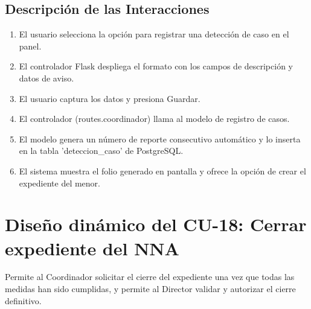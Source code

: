 \subsection{Descripción de las Interacciones}
\begin{enumerate}
    \item El usuario selecciona la opción para registrar una detección de caso en el panel.
    \item El controlador Flask despliega el formato con los campos de descripción y datos de aviso.
    \item El usuario captura los datos y presiona Guardar.
    \item El controlador (routes.coordinador) llama al modelo de registro de casos.
    \item El modelo genera un número de reporte consecutivo automático y lo inserta en la tabla 'deteccion\_caso' de PostgreSQL.
    \item El sistema muestra el folio generado en pantalla y ofrece la opción de crear el expediente del menor.
\end{enumerate}

\cleardoublepage
\section{Diseño dinámico del CU-18: Cerrar expediente del NNA}
\label{sec:disenoDinamicoCU18}

Permite al Coordinador solicitar el cierre del expediente una vez que todas las medidas han sido cumplidas, y permite al Director validar y autorizar el cierre definitivo.

